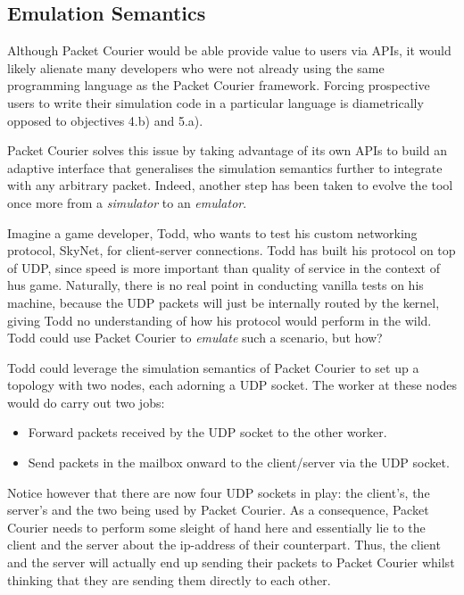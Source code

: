 \subsection{Emulation Semantics}\label{subsection:emulation_semantics}

Although Packet Courier would be able provide value to users via APIs, it would likely alienate many developers who
were not already using the same programming language as the Packet Courier framework. Forcing prospective users to
write their simulation code in a particular language is diametrically opposed to objectives 4.b) and 5.a).

Packet Courier solves this issue by taking advantage of its own APIs to build an adaptive interface that generalises
the simulation semantics further to integrate with any arbitrary packet. Indeed, another step has been taken to
evolve the tool once more from a \emph{simulator} to an \emph{emulator}.

Imagine a game developer, Todd, who wants to test his custom networking protocol, SkyNet, for client-server
connections. Todd has built his protocol on top of UDP, since speed is more important than quality of service in the
context of hus game. Naturally, there is no real point in conducting vanilla tests on his machine, because the UDP
packets will just be internally routed by the kernel, giving Todd no understanding of how his protocol would perform
in the wild. Todd could use Packet Courier to \emph{emulate} such a scenario, but how?

Todd could leverage the simulation semantics of Packet Courier to set up a topology with two nodes, each adorning a UDP
socket. The worker at these nodes would do carry out two jobs:
\begin{itemize}
    \item Forward packets received by the UDP socket to the other worker.
    \item Send packets in the mailbox onward to the client/server via the UDP socket.
\end{itemize}

Notice however that there are now four UDP sockets in play: the client's, the server's and the two being used by
Packet Courier. As a consequence, Packet Courier needs to perform some sleight of hand here and essentially lie to
the client and the server about the ip-address of their counterpart. Thus, the client and the server will actually
end up sending their packets to Packet Courier whilst thinking that they are sending them directly to each other.

